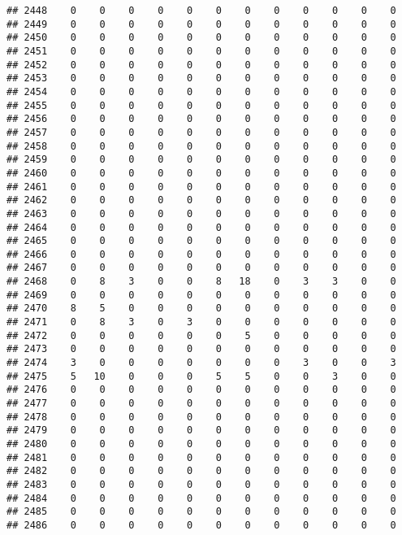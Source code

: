 \documentclass[]{article}
\begin{document}
\begin{verbatim}
## 2448    0    0    0    0    0    0    0    0    0    0    0    0
## 2449    0    0    0    0    0    0    0    0    0    0    0    0
## 2450    0    0    0    0    0    0    0    0    0    0    0    0
## 2451    0    0    0    0    0    0    0    0    0    0    0    0
## 2452    0    0    0    0    0    0    0    0    0    0    0    0
## 2453    0    0    0    0    0    0    0    0    0    0    0    0
## 2454    0    0    0    0    0    0    0    0    0    0    0    0
## 2455    0    0    0    0    0    0    0    0    0    0    0    0
## 2456    0    0    0    0    0    0    0    0    0    0    0    0
## 2457    0    0    0    0    0    0    0    0    0    0    0    0
## 2458    0    0    0    0    0    0    0    0    0    0    0    0
## 2459    0    0    0    0    0    0    0    0    0    0    0    0
## 2460    0    0    0    0    0    0    0    0    0    0    0    0
## 2461    0    0    0    0    0    0    0    0    0    0    0    0
## 2462    0    0    0    0    0    0    0    0    0    0    0    0
## 2463    0    0    0    0    0    0    0    0    0    0    0    0
## 2464    0    0    0    0    0    0    0    0    0    0    0    0
## 2465    0    0    0    0    0    0    0    0    0    0    0    0
## 2466    0    0    0    0    0    0    0    0    0    0    0    0
## 2467    0    0    0    0    0    0    0    0    0    0    0    0
## 2468    0    8    3    0    0    8   18    0    3    3    0    0
## 2469    0    0    0    0    0    0    0    0    0    0    0    0
## 2470    8    5    0    0    0    0    0    0    0    0    0    0
## 2471    0    8    3    0    3    0    0    0    0    0    0    0
## 2472    0    0    0    0    0    0    5    0    0    0    0    0
## 2473    0    0    0    0    0    0    0    0    0    0    0    0
## 2474    3    0    0    0    0    0    0    0    3    0    0    3
## 2475    5   10    0    0    0    5    5    0    0    3    0    0
## 2476    0    0    0    0    0    0    0    0    0    0    0    0
## 2477    0    0    0    0    0    0    0    0    0    0    0    0
## 2478    0    0    0    0    0    0    0    0    0    0    0    0
## 2479    0    0    0    0    0    0    0    0    0    0    0    0
## 2480    0    0    0    0    0    0    0    0    0    0    0    0
## 2481    0    0    0    0    0    0    0    0    0    0    0    0
## 2482    0    0    0    0    0    0    0    0    0    0    0    0
## 2483    0    0    0    0    0    0    0    0    0    0    0    0
## 2484    0    0    0    0    0    0    0    0    0    0    0    0
## 2485    0    0    0    0    0    0    0    0    0    0    0    0
## 2486    0    0    0    0    0    0    0    0    0    0    0    0

\end{verbatim}
\end{document}
